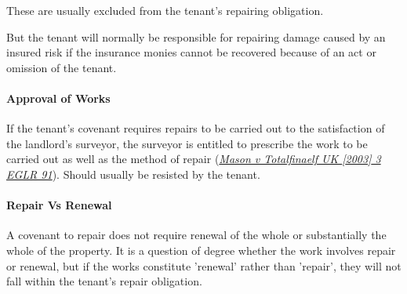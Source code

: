 \documentclass[
]{article}
\begin{document}
These are usually excluded from the tenant's repairing obligation.

But the tenant will normally be responsible for repairing damage caused
by an insured risk if the insurance monies cannot be recovered because
of an act or omission of the tenant.

\hypertarget{approval-of-works}{%
\paragraph{Approval of Works}\label{approval-of-works}}

If the tenant's covenant requires repairs to be carried out to the
satisfaction of the landlord's surveyor, the surveyor is entitled to
prescribe the work to be carried out as well as the method of repair
(\emph{\href{https://uk.practicallaw.thomsonreuters.com/D-009-7111?originationContext=document\&transitionType=PLDocumentLink\&contextData=(sc.Default)\&ppcid=966adc813d44458ba2271293efe92ed6}{Mason
v Totalfinaelf UK {[}2003{]} 3 EGLR 91}}). Should usually be resisted by
the tenant.

\hypertarget{repair-vs-renewal}{%
\paragraph{Repair Vs Renewal}\label{repair-vs-renewal}}

A covenant to repair does not require renewal of the whole or
substantially the whole of the property. It is a question of degree
whether the work involves repair or renewal, but if the works constitute
'renewal' rather than 'repair', they will not fall within the tenant's
repair obligation.
\end{document}
